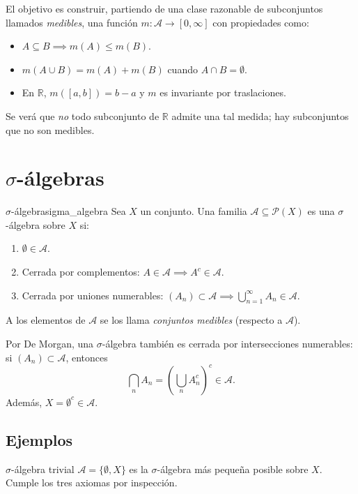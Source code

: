 \documentclass[11pt, a4paper]{article}
\begin{document}
El objetivo es construir, partiendo de una clase razonable de subconjuntos llamados
\emph{medibles}, una función $m: \mathcal{A} \to [0, \infty]$ con propiedades como:
\begin{itemize}
    \item $A \subseteq B \implies m(A) \le m(B)$.
    \item $m(A \cup B) = m(A) + m(B)$ cuando $A \cap B = \emptyset$.
    \item En $\mathbb{R}$, $m([a, b]) = b - a$ y $m$ es invariante por traslaciones.
\end{itemize}
Se verá que \emph{no} todo subconjunto de $\mathbb{R}$ admite una tal medida; hay subconjuntos
 que no son medibles.

\newpage

\section{\texorpdfstring{$\sigma$}{σ}-álgebras}

\begin{definicion}{$\sigma$-álgebra}{sigma_algebra}
Sea $X$ un conjunto. Una familia $\mathcal{A} \subseteq \mathcal{P}(X)$ es una $\sigma$-álgebra
sobre $X$ si:
\begin{enumerate}
    \item $\emptyset \in \mathcal{A}$.
    \item Cerrada por complementos: $A \in \mathcal{A} \implies A^c \in \mathcal{A}$.
    \item Cerrada por uniones numerables: $(A_n) \subset \mathcal{A} \implies
    \bigcup_{n=1}^\infty A_n \in \mathcal{A}$.
\end{enumerate}
A los elementos de $\mathcal{A}$ se los llama \emph{conjuntos medibles} (respecto a $\mathcal{A}$).
\end{definicion}

\obs Por De Morgan, una $\sigma$-álgebra también es cerrada por intersecciones numerables: si
$(A_n) \subset \mathcal{A}$, entonces
$$ \bigcap_n A_n = \left( \bigcup_n A_n^c \right)^c \in \mathcal{A}. $$
Además, $X = \emptyset^c \in \mathcal{A}$.

\subsection{Ejemplos}

\begin{ejemplo}{$\sigma$-álgebra trivial}{}
$\mathcal{A} = \{\emptyset, X\}$ es la $\sigma$-álgebra más pequeña posible sobre $X$. Cumple
los tres axiomas por inspección.
\end{ejemplo}
\end{document}
